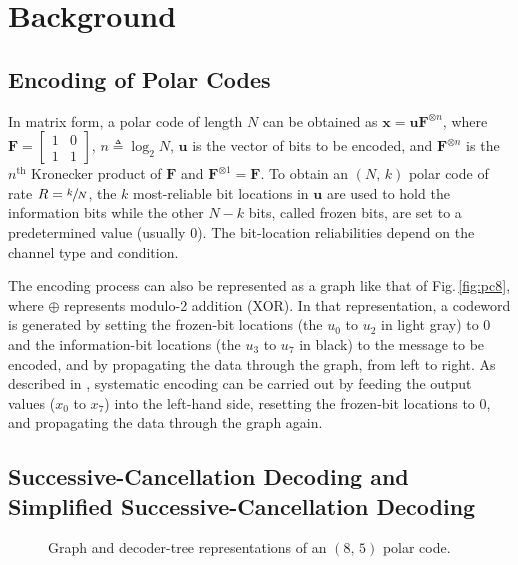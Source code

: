\documentclass[conference,letterpaper]{IEEEtran}
\newcommand{\mvec}[1]{\bm{#1}}
\begin{document}
\section{Background}\label{sec:bg}
\subsection{Encoding of Polar Codes}\label{sec:bg:enc}
In matrix form, a polar code of length $N$ can be obtained as $\mvec{x} {=} \mvec{u}\mvec{F}^{\otimes n}$, where $\mvec{F} {=} \left[ \begin{smallmatrix} 1 & 0 \\ 1 & 1 \end{smallmatrix} \right]$, $n \triangleq \log _2 N$, $\mvec{u}$ is the vector of bits to be encoded, and $\mvec{F}^{\otimes n}$ is the $n^{\text{th}}$ Kronecker product of $\mvec{F}$ and $\mvec{F}^{\otimes 1}{=}\mvec{F}$. To obtain an $(N,\,k)$ polar code of rate $R=\sfrac{k}{N}$, the $k$ most-reliable bit locations in $\mvec{u}$ are used to hold the information bits while the other $N{-}k$ bits, called frozen bits, are set to a predetermined value (usually 0). The bit-location reliabilities depend on the channel type and condition.

The encoding process can also be represented as a graph like that of Fig.\,\ref{fig:pc8}, where $\oplus$ represents modulo-2 addition (XOR). In that representation, a codeword is generated by setting the frozen-bit locations (the $u_0$ to $u_2$ in light gray) to 0 and the information-bit locations (the $u_3$ to $u_7$ in black) to the message to be encoded, and by propagating the data through the graph, from left to right. As described in \cite{Sarkis_TCOMM_2015}, systematic encoding can be carried out by feeding the output values ($x_0$ to $x_7$) into the left-hand side, resetting the frozen-bit locations to 0, and propagating the data through the graph again.

\subsection{Successive-Cancellation Decoding and Simplified Successive-Cancellation Decoding}\label{sec:bg:sc}
\begin{figure}[t]
  \begin{minipage}{0.6\columnwidth}
    \centering
    \subfloat[Graph]{\label{fig:pc8}\hspace{-15pt}\resizebox{\columnwidth}{!}{}}
  \end{minipage}%
  \begin{minipage}{0.38\columnwidth}
    \centering
    \vspace{-11pt}
  \end{minipage}
  \caption{Graph and decoder-tree representations of an $(8,\,5)$ polar code.}
  \label{fig:pc_8_5}
\end{figure}
\end{document}
